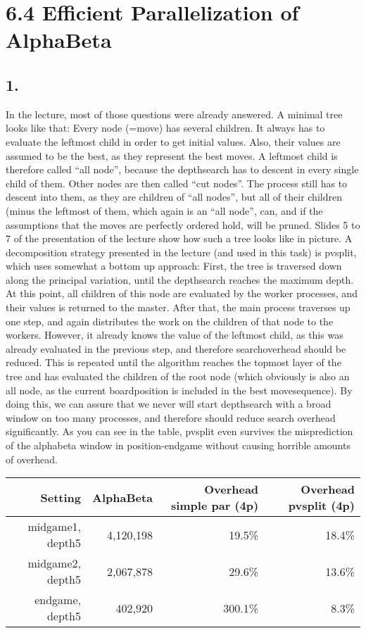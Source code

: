 \section*{6.4 Efficient Parallelization of AlphaBeta}

\subsection*{1.}
In the lecture, most of those questions were already answered. A minimal tree looks like that: Every node (=move) has several children. It always has to evaluate the leftmost child in order to get initial values. Also, their values are assumed to be the best, as they represent the best moves. A leftmost child is therefore called ``all node'', because the depthsearch has to descent in every single child of them. Other nodes are then called ``cut nodes''. The process still has to descent into them, as they are children of ``all nodes'', but all of their children (minus the leftmost of them, which again is an ``all node'', can, and if the assumptions that the moves are perfectly ordered hold, will be pruned. Slides 5 to 7 of the presentation of the lecture show how such a tree looks like in picture.
A decomposition strategy presented in the lecture (and used in this task) is pvsplit, which uses somewhat a bottom up approach: First, the tree is traversed down along the principal variation, until the depthsearch reaches the maximum depth. At this point, all children of this node are evaluated by the worker processes, and their values is returned to the master. After that, the main process traverses up one step, and again distributes the work on the children of that node to the workers. However, it already knows the value of the leftmost child, as this was already evaluated in the previous step, and therefore searchoverhead should be reduced. This is repeated until the algorithm reaches the topmost layer of the tree and has evaluated the children of the root node (which obviously is also an all node, as the current boardposition is included in the best movesequence). By doing this, we can assure that we never will start depthsearch with a broad window on too many processes, and therefore should reduce search overhead significantly.
As you can see in the table, pvsplit even survives the misprediction of the alphabeta window in position-endgame without causing horrible amounts of overhead.
\begin{center}
  \begin{tabular}{|r|r|r|r|}
    \hline
    Setting & AlphaBeta & Overhead simple par (4p)& Overhead pvsplit (4p)\\ \hline
    midgame1, depth5 & 4,120,198 & 19.5\% & 18.4\%  \\ \hline
    midgame2, depth5 & 2,067,878 & 29.6\% & 13.6\%   \\ \hline
    endgame, depth5 & 402,920 & 300.1\% & 8.3\%   \\ \hline
  \end{tabular}
\end{center}


